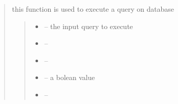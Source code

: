 \documentclass[letterpaper,10pt,english]{sphinxmanual}
\begin{document}
\begin{quote}
\begin{savenotes}
\begin{fulllineitems}
\begin{savenotes}
\begin{fulllineitems}
\end{fulllineitems}\end{savenotes}


\begin{savenotes}\begin{fulllineitems}
\label{\detokenize{setting/database:oxin.database.dataBase.delete}}
\pysigstartsignatures
{}
\pysigstopsignatures
\end{fulllineitems}\end{savenotes}


\begin{savenotes}\begin{fulllineitems}
\label{\detokenize{setting/database:oxin.database.dataBase.execute_quary}}
\pysigstartsignatures
{}
\pysigstopsignatures
\sphinxAtStartPar
this function is used to execute a query on database
\begin{quote}\begin{description}
\begin{itemize}
\item {} 
\sphinxAtStartPar
{} – the input query to execute

\item {} 
\sphinxAtStartPar
{} – 

\item {} 
\sphinxAtStartPar
{} – 

\item {} 
\sphinxAtStartPar
{} – a bolean value

\item {} 
\sphinxAtStartPar
{} – 


\end{itemize}
\end{description}
\end{quote}
\end{fulllineitems}
\end{savenotes}
\end{fulllineitems}
\end{savenotes}
\end{quote}
\end{document}
